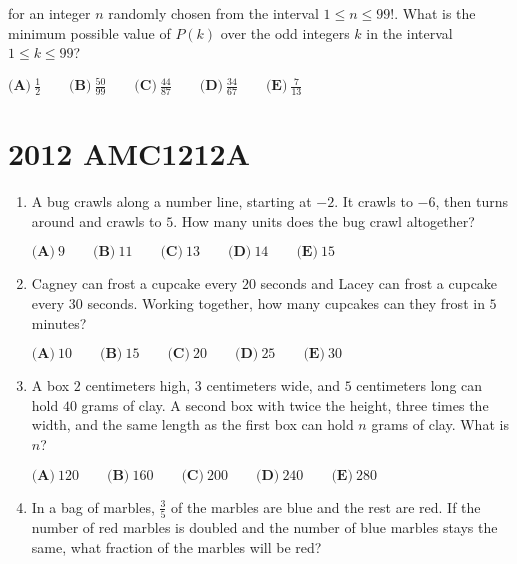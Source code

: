 \documentclass{article}
\begin{document}
\begin{enumerate}[label=\arabic*., itemsep=0.5em]
for an integer \(n\) randomly chosen from the interval \(1 \leq n \leq 99!\). What is the minimum possible value of \(P(k)\) over the odd integers \(k\) in the interval \(1 \leq k \leq 99\)?

\(\textbf{(A)}\ \frac{1}{2} \qquad \textbf{(B)}\ \frac{50}{99} \qquad \textbf{(C)}\ \frac{44}{87} \qquad \textbf{(D)}\  \frac{34}{67} \qquad \textbf{(E)}\  \frac{7}{13}\)\par \vspace{0.5em}\end{enumerate}\newpage\section*{2012 AMC1212A}\begin{enumerate}[label=\arabic*., itemsep=0.5em]\item A bug crawls along a number line, starting at \(-2\). It crawls to \(-6\), then turns around and crawls to \(5\). How many units does the bug crawl altogether?

\( \textbf{(A)}\ 9\qquad\textbf{(B)}\ 11\qquad\textbf{(C)}\ 13\qquad\textbf{(D)}\ 14\qquad\textbf{(E)}\ 15 \)\par \vspace{0.5em}\item Cagney can frost a cupcake every \(20\) seconds and Lacey can frost a cupcake every \(30\) seconds. Working together, how many cupcakes can they frost in \(5\) minutes?

\( \textbf{(A)}\ 10\qquad\textbf{(B)}\ 15\qquad\textbf{(C)}\ 20\qquad\textbf{(D)}\ 25\qquad\textbf{(E)}\ 30 \)\par \vspace{0.5em}\item A box \(2\) centimeters high, \(3\) centimeters wide, and \(5\) centimeters long can hold \(40\) grams of clay.  A second box with twice the height, three times the width, and the same length as the first box can hold \(n\) grams of clay.  What is \(n\)?

\(\textbf{(A)}\ 120\qquad\textbf{(B)}\ 160\qquad\textbf{(C)}\ 200\qquad\textbf{(D)}\ 240\qquad\textbf{(E)}\ 280\)\par \vspace{0.5em}\item In a bag of marbles, \(\tfrac{3}{5}\) of the marbles are blue and the rest are red.  If the number of red marbles is doubled and the number of blue marbles stays the same, what fraction of the marbles will be red?


\end{enumerate}
\end{document}

